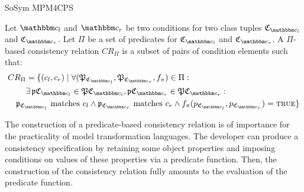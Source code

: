 \begin{copiedFrom}{SoSym MPM4CPS}
\begin{definition}
Let $\condition{c}{l}$ and $\condition{c}{r}$ be two conditions for two class tuples $\classtuple{C}{\condition{c}{l}}$ and $\classtuple{C}{\condition{c}{r}}$. 
Let $\Pi$ be a set of predicates for $\classtuple{C}{\condition{c}{l}}$ and $\classtuple{C}{\condition{c}{r}}$. A $\Pi$-based consistency relation $CR_{\Pi}$ is a subset of pairs of condition elements such that:
\begin{align*}
&
CR_{\Pi} = \{(c_l, c_r) \mid \forall (\tuple{P}_{\classtuple{C}{\condition{c}{l}}}, \tuple{P}_{\classtuple{C}{\condition{c}{r}}}, f_\pi) \in \Pi : \\
& \formulaskip\formulaskip
\exists \tuple{p}{\classtuple{C}{\condition{c}{l}}} \in \tuple{P}{\classtuple{C}{\condition{c}{l}}},
\tuple{p}{\classtuple{C}{\condition{c}{r}}} \in \tuple{P}{\classtuple{C}{\condition{c}{r}}}:\\
& \formulaskip
\propertyvaluesettuple{p}{\classtuple{C}{\condition{c}{l}}}\  \text{matches}\ c_l %
\wedge \propertyvaluesettuple{p}{\classtuple{C}{\condition{c}{r}}}\ \text{matches}\ c_r %
\wedge f_{\pi}(p_{\classtuple{C}{\condition{c}{l}}}, p_{\classtuple{C}{\condition{c}{r}}}) = \textsc{true}\}
\end{align*}
\end{definition}


The construction of a predicate-based consistency relation is of importance for the practicality of model transformation languages. The developer can produce a consistency specification by retaining some object properties and imposing conditions on values of these properties via a predicate function. Then, the construction of the consistency relation fully amounts to the evaluation of the predicate function.


\end{copiedFrom}
